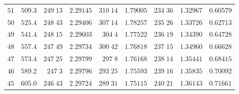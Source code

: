 \begin{center}
\begin{tabular}{r|r|r|r|r|r|r|r|r}
$51$&$509.3$&$249\;13$&$2.29145$&$310\;14$&$1.79005$&$234\;36$&$1.32967$&$0.60579$\\[2pt]
$50$&$525.4$&$248\;43$&$2.29406$&$307\;14$&$1.78257$&$235\;26$&$1.33726$&$0.62713$\\
$49$&$541.4$&$248\;15$&$2.29603$&$304\;4$&$1.77522$&$236\;19$&$1.34390$&$0.64728$\\
$48$&$557.4$&$247\;49$&$2.29734$&$300\;42$&$1.76818$&$237\;15$&$1.34960$&$0.66628$\\
$47$&$573.4$&$247\;25$&$2.29799$&$297\;8$&$1.76168$&$238\;14$&$1.35441$&$0.68415$\\
$46$&$589.2$&$247\;3$&$2.29796$&$293\;25$&$1.75593$&$239\;16$&$1.35835$&$0.70092$\\[2pt]
$45$&$605.0$&$246\;43$&$2.29724$&$289\;31$&$1.75115$&$240\;21$&$1.36143$&$0.71661$\\
\hline
\end{tabular}
\end{center}
\endgroup
\clearpage
{}
\begingroup
\fontsize{9}{10.2}\selectfont
\setlength{\tabcolsep}{1.5pt}
\renewcommand{\arraystretch}{1.02}
